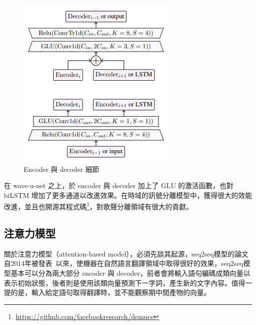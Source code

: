 \begin{figure}[htbp]
\begin{minipage}[t]{0.45\textwidth}
        \includegraphics[width=\textwidth]{./figures/chapter02_method/demucs2.png}
        \caption {Encoder 與 decoder 細節}
        \label{demucs2}
    \end{minipage}
    \hfil
\end{figure}
在 wave-u-net 之上，於 encoder 與 decoder 加上了 GLU 的激活函數，也對 biLSTM 增加了更多通道以改進效果。在時域的訊號分離模型中，獲得很大的效能改進，並且也開源其程式碼\footnote{\url{https://github.com/facebookresearch/demucs}}，對歌聲分離領域有很大的貢獻。

\subsection{注意力模型}
關於注意力模型（attention-based model），必須先談其起源，seq2seq模型的論文自2014年被發表~\cite{vaswani2017attention}以來，使機器在自然語言翻譯領域中取得很好的效果，seq2seq模型基本可以分為兩大部分 encoder 與 decoder，前者會將輸入語句編碼成類向量以表示初始狀態，後者則是使用該類向量預測下一字詞，產生新的文字內容。值得一提的是，輸入給定語句取得翻譯時，並不能觀察期中間產物的向量。

